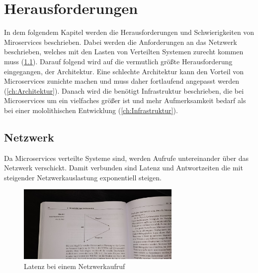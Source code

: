 \chapter{Herausforderungen}

In dem folgendem Kapitel werden die Herausforderungen und Schwierigkeiten von Miroservices beschrieben. Dabei werden die Anforderungen an das Netzwerk beschrieben, welches mit den Lasten von Verteilten Systemen zurecht kommen muss (\ref{ch:netzwerk}). Darauf folgend wird auf die vermutlich größte Herausforderung eingegangen, der Architektur. Eine schlechte Architektur kann den Vorteil von Microservices zunichte machen und muss daher fortlaufend angepasst werden (\ref{ch:Architektur}). Danach wird die benötigt Infrastruktur beschrieben, die bei Microservices um ein vielfaches größer ist und mehr Aufmerksamkeit bedarf als bei einer mololithischen Entwicklung (\ref{ch:Infrastruktur}).

\section{Netzwerk} \label{ch:netzwerk}

Da Microservices verteilte Systeme sind, werden Aufrufe untereinander über das Netzwerk verschickt. Damit verbunden sind Latenz und Antwortzeiten die mit steigender Netzwerkauslastung exponentiell steigen. \newline
\begin{figure}[bth] 
	\centering
	\includegraphics[width=0.7\textwidth]{Graphics/Latenz}
	\caption{Latenz bei einem Netzwerkaufruf}
	\label{fig:Latenz}
\end{figure}

